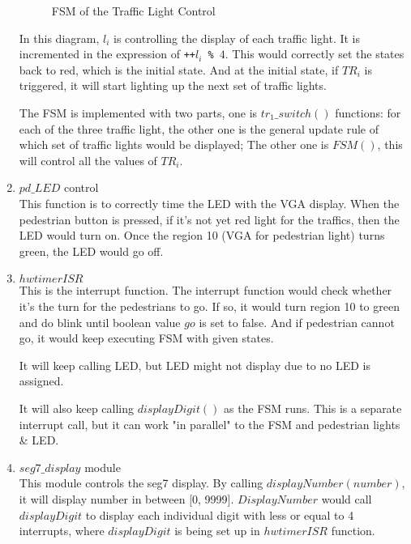 \documentclass[a4paper,final]{scrartcl}
\numberwithin{equation}{section}		%
\numberwithin{figure}{section}			%
\numberwithin{table}{section}				%
\begin{document}
\begin{enumerate}
\begin{figure}[H]
					\caption{FSM of the Traffic Light Control}
					\label{fig:fsm}
				\end{figure}
				In this diagram, $l_i$ is controlling the display of each traffic light. It is incremented in the expression of \texttt{++$l_i$ \% $4$}. This would correctly set the states back to red, which is the initial state. And at the initial state, if $TR_{i}$ is triggered, it will start lighting up the next set of traffic lights.

				The FSM is implemented with two parts, one is $tr_1\_switch()$ functions: for each of the three traffic light, the other one is the general update rule of which set of traffic lights would be displayed; The other one is $FSM()$, this will control all the values of $TR_i$.
		\item $pd\_LED$ control \hfill \\
				This function is to correctly time the LED with the VGA display. When the pedestrian button is pressed, if it's not yet red light for the traffics, then the LED would turn on. Once the region 10 (VGA for pedestrian light) turns green, the LED would go off.
		\item $hwtimerISR$ \hfill \\
				This is the interrupt function. The interrupt function would check whether it's the turn for the pedestrians to go. If so, it would turn region 10 to green and do blink until boolean value $go$ is set to false. And if pedestrian cannot go, it would keep executing FSM with given states.

				It will keep calling LED, but LED might not display due to no LED is assigned.

				It will also keep calling $displayDigit()$ as the FSM runs. This is a separate interrupt call, but it can work "in parallel" to the FSM and pedestrian lights \& LED.
		\item $seg7\_display$ module \hfill \\
				This module controls the seg7 display. By calling $displayNumber(number)$, it will display number in between [0, 9999]. $DisplayNumber$ would call $displayDigit$ to display each individual digit with less or equal to 4 interrupts, where $displayDigit$ is being set up in $hwtimerISR$ function.
	\end{enumerate}
\end{document}
